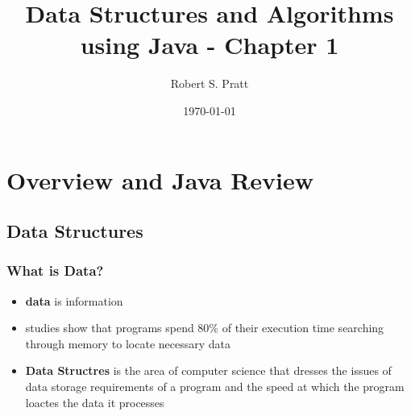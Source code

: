 \documentclass[11pt]{article}
\author{Robert S. Pratt}
\date{\today}
\title{Data Structures and Algorithms using Java - Chapter 1}
\begin{document}
\maketitle
\tableofcontents


\section{Overview and Java Review}
\label{sec:org87e60b5}
\subsection{Data Structures}
\label{sec:org18de5ad}
\subsubsection{What is Data?}
\label{sec:org6f46280}
\begin{itemize}
\item \textbf{data} is information
\item studies show that programs spend 80\% of their execution time searching through memory to locate necessary data
\item \textbf{Data Structres} is the area of computer science that dresses the issues of data storage requirements of a program and the speed at which the program loactes the data it processes
\end{itemize}
\end{document}
